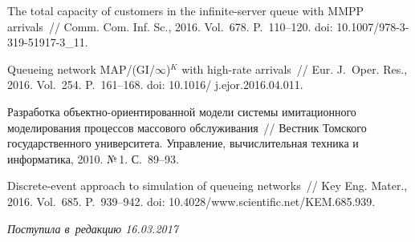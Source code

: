 \begin{multicols}{2}
{{\begin{thebibliography}{99}
The total capacity of customers in the infinite-server queue with MMPP arrivals~// 
Comm. Com. Inf. Sc., 2016. Vol.~678. P.~110--120.
doi: 10.1007/978-3-319-51917-3\_11.
    


Queueing network MAP/(GI/$\infty$)$^K$ with high-rate arrivals~// Eur. 
J.~Oper. Res., 2016. Vol.~254. P.~161--168.
doi: 10.1016/ j.ejor.2016.04.011.





 Разработка 
объ\-ект\-но-ори\-ен\-ти\-ро\-ван\-ной модели системы имитационного\linebreak 
моделирования процессов массового обслуживания~// 
Вестник Томского государственного университета. 
Управление, вычислительная техника и информатика, 2010. №\,1. С.~89--93.

Discrete-event approach to simulation of queueing networks~// 
Key Eng. Mater., 2016. Vol.~685. P.~939--942.
doi: 10.4028/www.scientific.net/KEM.685.939.

\end{thebibliography}
} }

\end{multicols}

 \label{end\stat}

 \vspace*{-3pt}

\hfill{\small\textit{Поступила в~редакцию  16.03.2017}}
\renewcommand{\figurename}{\protect\bf Рис.}
\renewcommand{\tablename}{\protect\bf Таблица} 